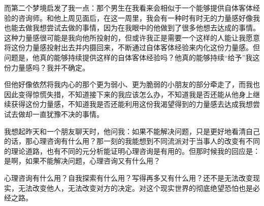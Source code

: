 而第二个梦境启发了我一点：那个男生在我看来会相似于一个能够提供自体客体经验的咨询师。和他上周见面后，在这一周里，我会有一种时有时无的力量感\pozhehao{}好像我也能去做我想尝试去做的事情，因为在我眼中的他做到了很多他想去达成的事情。这种力量感很可能是我向他所投射的，但或许我正是需要一个这样的人\pozhehao{}能让我愿意将这份力量感投射出去并内摄回来，不断通过自体客体经验来内化这份力量感。但问题是，他真的能够持续提供这样的自体客体经验吗？他真的能够持续“给予”我这份力量感吗？我并不确定。

但他好像依然将我内心的那个更为弱小、更为脆弱的小朋友的部分牵走了，而我也因此变得惊慌失措，不知道接下来的我应该怎么办，不知道我是否还能从他身上继续获得这份力量感，不知道我是否还能利用这份我渴望得到的力量感去达成我想尝试去做却一直犹豫不决的事情。

我想起昨天和一个朋友聊天时，他问我：如果不能解决问题，只是更好地看清自己的话，那心理咨询有什么用？那一刻的我能想到不同流派对于当事人的改变有不同的理论道路，也有不同的元分析能证明心理咨询是有用的。但那时候我的回应是：是啊，如果不能解决问题，心理咨询又有什么用？

心理咨询有什么用？自我探索有什么用？写得再多又有什么用？还不是无法改变现实，无法改变他人，无法改变对方的决定。对这个现实世界的彻底绝望恐怕也是必经之路。



